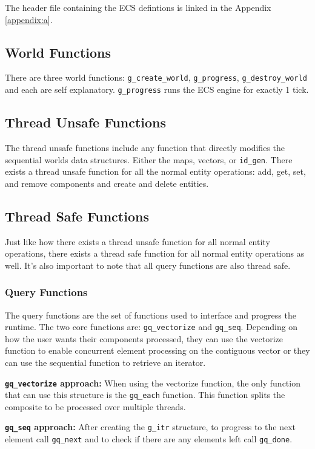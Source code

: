 The header file containing the ECS defintions is linked in the Appendix \ref{appendix:a}.

\subsection{World Functions}
There are three world functions: \texttt{g\_create\_world}, \texttt{g\_progress}, \texttt{g\_destroy\_world} and each are self explanatory. \texttt{g\_progress} runs the ECS engine for exactly 1 tick.

\subsection{Thread Unsafe Functions}
The thread unsafe functions include any function that directly modifies the sequential worlds data structures. Either the maps, vectors, or \texttt{id\_gen}. There exists a thread unsafe function for all the normal entity operations: add, get, set, and remove components and create and delete entities.  

\subsection{Thread Safe Functions}

Just like how there exists a thread unsafe function for all normal entity operations, there exists a thread safe function for all normal entity operations as well. It's also important to note that all query functions are also thread safe.

\subsubsection{Query Functions}
The query functions are the set of functions used to interface and progress the runtime. The two core functions are: \texttt{gq\_vectorize} and \texttt{gq\_seq}. Depending on how the user wants their components processed, they can use the vectorize function to enable concurrent element processing on the contiguous vector or they can use the sequential function to retrieve an iterator.

\textbf{\texttt{gq\_vectorize} approach:} When using the vectorize function, the only function that can use this structure is the \texttt{gq\_each} function. This function splits the composite to be processed over multiple threads.

\textbf{\texttt{gq\_seq} approach:} After creating the \texttt{g\_itr} structure, to progress to the next element call \texttt{gq\_next} and to check if there are any elements left call \texttt{gq\_done}.

